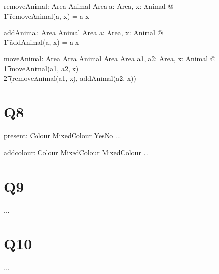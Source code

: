 \documentclass{article}
\begin{document}
\begin{axdef}
	removeAnimal: Area \cross Animal \pfun Area
\where
	\forall a: Area, x: Animal @ \\
		\t1 removeAnimal(a, x) = a \uminus x
\end{axdef}


\begin{axdef} %
	addAnimal: Area \cross Animal \pfun Area
\where
	\forall a: Area, x: Animal @ \\
		\t1 addAnimal(a, x) = a \uplus x
\end{axdef}

	
\begin{axdef} %
	moveAnimal: Area \cross Area \cross Animal \pfun Area \cross Area
\where
\forall a1, a2: Area, x: Animal @ \\
	\t1 moveAnimal(a1, a2, x) = \\ \t2 (removeAnimal(a1, x), addAnimal(a2, x))
\end{axdef}

\section*{Q8}

\begin{axdef}
	present: Colour \cross MixedColour \fun YesNo
\where
	...
\end{axdef}

\begin{axdef}
	addcolour: Colour \cross MixedColour \fun MixedColour
\where
	...
\end{axdef}

\section*{Q9}
...

\section*{Q10}
...

\end{document}
